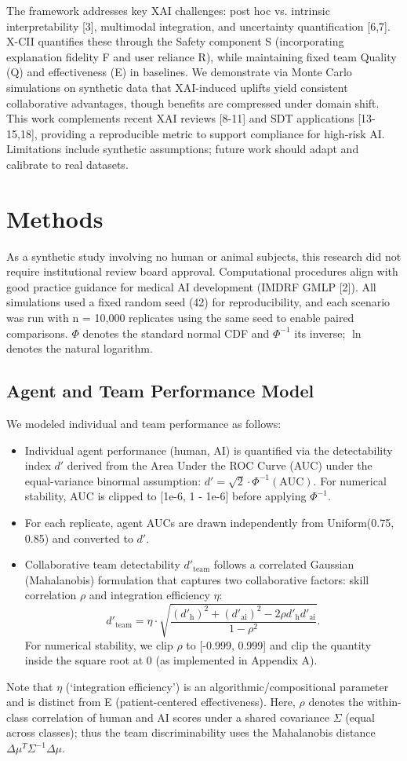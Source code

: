 \documentclass[11pt,a4paper]{article}
\begin{document}
The framework addresses key XAI challenges: post hoc vs. intrinsic interpretability [3], multimodal integration, and uncertainty quantification [6,7]. X-CII quantifies these through the Safety component S (incorporating explanation fidelity F and user reliance R), while maintaining fixed team Quality (Q) and effectiveness (E) in baselines. We demonstrate via Monte Carlo simulations on synthetic data that XAI-induced uplifts yield consistent collaborative advantages, though benefits are compressed under domain shift. This work complements recent XAI reviews [8-11] and SDT applications [13-15,18], providing a reproducible metric to support compliance for high-risk AI. Limitations include synthetic assumptions; future work should adapt and calibrate to real datasets.
\section{Methods}
As a synthetic study involving no human or animal subjects, this research did not require institutional review board approval. Computational procedures align with good practice guidance for medical AI development (IMDRF GMLP [2]). All simulations used a fixed random seed (42) for reproducibility, and each scenario was run with n = 10,000 replicates using the same seed to enable paired comparisons. $\Phi$ denotes the standard normal CDF and $\Phi^{-1}$ its inverse; $\ln$ denotes the natural logarithm.
\subsection{Agent and Team Performance Model}
We modeled individual and team performance as follows:
\begin{itemize}
\item Individual agent performance (human, AI) is quantified via the detectability index $d'$ derived from the Area Under the ROC Curve (AUC) under the equal-variance binormal assumption: $d' = \sqrt{2} \cdot \Phi^{-1}(\text{AUC})$. For numerical stability, AUC is clipped to [1e-6, 1 - 1e-6] before applying $\Phi^{-1}$.
\item For each replicate, agent AUCs are drawn independently from Uniform(0.75, 0.85) and converted to $d'$.
\item Collaborative team detectability $d'_{\text{team}}$ follows a correlated Gaussian (Mahalanobis) formulation that captures two collaborative factors: skill correlation $\rho$ and integration efficiency $\eta$:
\[
d'_{\text{team}} = \eta \cdot \sqrt{\frac{(d'_{\text{h}})^2 + (d'_{\text{ai}})^2 - 2\rho d'_{\text{h}} d'_{\text{ai}}}{1 - \rho^2}}.
\]
For numerical stability, we clip $\rho$ to [-0.999, 0.999] and clip the quantity inside the square root at 0 (as implemented in Appendix A).
\end{itemize}
Note that $\eta$ (`integration efficiency') is an algorithmic/compositional parameter and is distinct from E (patient-centered effectiveness). Here, $\rho$ denotes the within-class correlation of human and AI scores under a shared covariance $\Sigma$ (equal across classes); thus the team discriminability uses the Mahalanobis distance $\Delta\mu^T\Sigma^{-1}\Delta\mu$.
\end{document}
